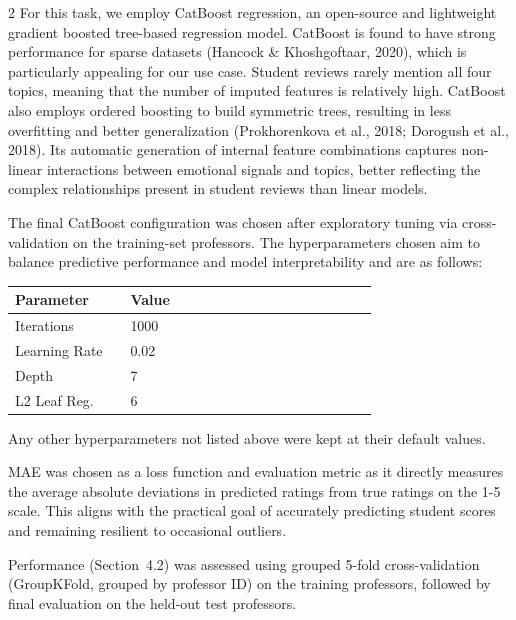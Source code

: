 \documentclass{article}
\begin{document}
\begin{multicols*}{2}
For this task, we employ CatBoost regression, an open-source and lightweight gradient boosted tree-based regression model. CatBoost is found to have strong performance for sparse datasets (Hancock \& Khoshgoftaar, 2020), which is particularly appealing for our use case. Student reviews rarely mention all four topics, meaning that the number of imputed features is relatively high. CatBoost also employs ordered boosting to build symmetric trees, resulting in less overfitting and better generalization (Prokhorenkova et al., 2018; Dorogush et al., 2018). Its automatic generation of internal feature combinations captures non-linear interactions between emotional signals and topics, better reflecting the complex relationships present in student reviews than linear models.

The final CatBoost configuration was chosen after exploratory tuning via cross-validation on the training-set professors. The hyperparameters chosen aim to balance predictive performance and model interpretability and are as follows:

\begin{center}
    \label{tab:CatBoost-params}
    \begin{tabular}{|p{0.28\linewidth}|p{0.35\linewidth}|p{0.25\linewidth}|}
        \hline
        Parameter              & Value \\ \hline
        Iterations             & 1000\\ \hline
        Learning Rate         & 0.02 \\ \hline
        Depth                  & 7 \\ \hline
        L2 Leaf Reg.          & 6   \\ \hline
         
    \end{tabular}
\end{center}
Any other hyperparameters not listed above were kept at their default values.

MAE was chosen as a loss function and evaluation metric as it directly measures the average absolute deviations in predicted ratings from true ratings on the 1-5 scale. This aligns with the practical goal of accurately predicting student scores and remaining resilient to occasional outliers. 

Performance (Section~4.2) was assessed using grouped 5-fold cross-validation (GroupKFold, grouped by professor ID) on the training professors, followed by final evaluation on the held-out test professors.


\end{multicols*}
\end{document}
